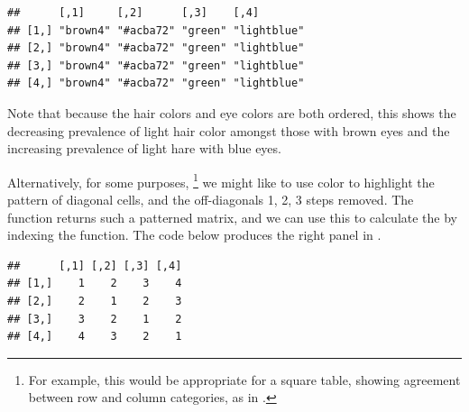 \documentclass[11pt]{book}
\renewenvironment{knitrout}{\small\renewcommand{\baselinestretch}{.85}}{} %
\begin{document}
\begin{knitrout}
\color{fgcolor}\begin{kframe}
\begin{alltt}
 \hlkwb{<-} \hlstd{(}\hlstd{,} \hlstd{,} \hlstd{,} \hlstd{)}
 \hlkwb{<-} \hlstd{(}\hlstd{(} \hlstd{),} \hlstd{=}\hlstd{)))}
\end{alltt}
\begin{verbatim}
##      [,1]     [,2]      [,3]    [,4]       
## [1,] "brown4" "#acba72" "green" "lightblue"
## [2,] "brown4" "#acba72" "green" "lightblue"
## [3,] "brown4" "#acba72" "green" "lightblue"
## [4,] "brown4" "#acba72" "green" "lightblue"
\end{verbatim}
\begin{alltt}
 \hlstd{=}\hlstd{(} \hlstd{=}\hlstd{))}
\end{alltt}
\end{kframe}
\end{knitrout}
\noindent Note that because the hair colors and eye colors are both ordered,
this shows the decreasing prevalence of light hair color amongst those with brown eyes
and the increasing prevalence of light hare with blue eyes.

Alternatively, for some purposes,%
\footnote{
For example, this would be appropriate for a square table, showing agreement between
row and column categories, as in .
}
we might like to use color to highlight the pattern
of diagonal cells, and the off-diagonals 1, 2, 3 steps removed.
The \R function  returns such a patterned matrix, and we can use this
to calculate the  by indexing the  function.  The code below produces the right panel in 
.
\begin{knitrout}
\color{fgcolor}\begin{kframe}
\begin{alltt}
\hlstd{(}\hlopt{:}\hlstd{)}
\end{alltt}
\begin{verbatim}
##      [,1] [,2] [,3] [,4]
## [1,]    1    2    3    4
## [2,]    2    1    2    3
## [3,]    3    2    1    2
## [4,]    4    3    2    1
\end{verbatim}
\begin{alltt}
 \hlkwb{<-} \hlstd{()[}\hlopt{+}\hlstd{(}\hlopt{:}\hlstd{)]}
 \hlstd{=}\hlstd{(} \hlstd{=}\hlstd{))}
\end{alltt}
\end{kframe}
\end{knitrout}
\end{document}
